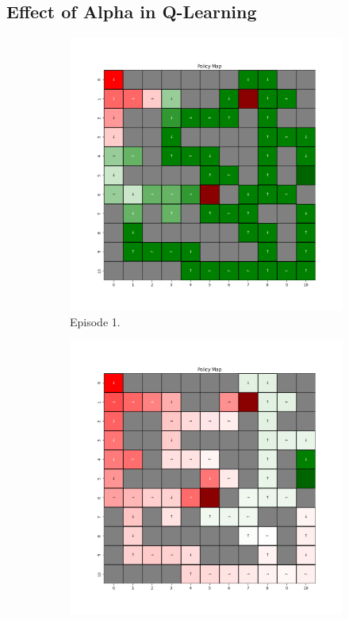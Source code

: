 \documentclass{assignment}
\begin{document}
\subsection{Effect of Alpha in Q-Learning}

\begin{figure}[H]
    \begin{subfigure}{0.3\textwidth}
        \includegraphics[width=\textwidth]{figures/policy_q/alpha_sweep/policy_alpha_0.001_gamma_0.95_epsilon_0.2_iteration_1.png}
    \caption{Episode 1.}
    \end{subfigure}\hfill
    \begin{subfigure}{0.3\textwidth}
        \includegraphics[width=\textwidth]{figures/policy_q/alpha_sweep/policy_alpha_0.001_gamma_0.95_epsilon_0.2_iteration_50.png}

\end{subfigure}
\end{figure}
\end{document}

